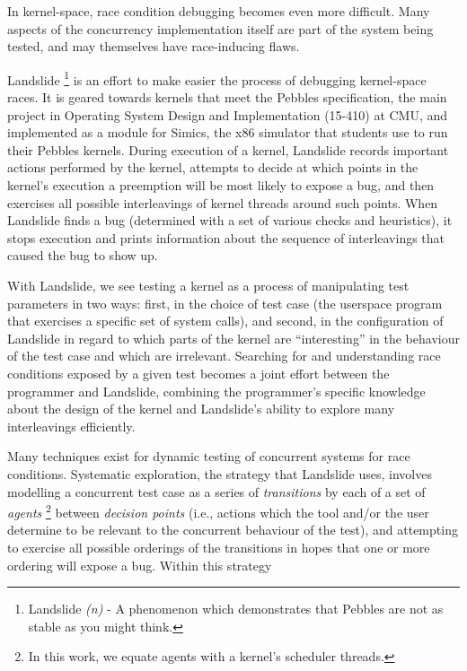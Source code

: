 \documentclass[10pt,twocolumn]{article}
\begin{document}
In kernel-space, race condition debugging becomes even more difficult. Many aspects of the concurrency implementation itself are part of the system being tested, and may themselves have race-inducing flaws.



Landslide
\footnote{Landslide {\em (n)} - A phenomenon which demonstrates that Pebbles are not as stable as you might think.}
is an effort to make easier the process of debugging kernel-space races.
It is geared towards kernels that meet the Pebbles specification, the main project in Operating System Design and Implementation (15-410) at CMU, and implemented as a module for Simics, the x86 simulator that students use to run their Pebbles kernels.
During execution of a kernel, Landslide records important actions performed by the kernel, attempts to decide at which points in the kernel's execution a preemption will be most likely to expose a bug, and then exercises all possible interleavings of kernel threads around such points.
When Landslide finds a bug (determined with a set of various checks and heuristics), it stops execution and prints information about the sequence of interleavings that caused the bug to show up.

With Landslide, we see testing a kernel as a process of manipulating test parameters in two ways: first, in the choice of test case (the userspace program that exercises a specific set of system calls), and second, in the configuration of Landslide in regard to which parts of the kernel are ``interesting'' in the behaviour of the test case and which are irrelevant.
Searching for and understanding race conditions exposed by a given test becomes a joint effort between the programmer and Landslide, combining the programmer's specific knowledge about the design of the kernel and Landslide's ability to explore many interleavings efficiently.

Many techniques exist for dynamic testing of concurrent systems for race conditions.
Systematic exploration, the strategy that Landslide uses, involves modelling a concurrent test case as a series of {\em transitions} by each of a set of {\em agents}
\footnote{In this work, we equate agents with a kernel's scheduler threads.}
between {\em decision points} (i.e., actions which the tool and/or the user determine to be relevant to the concurrent behaviour of the test), and attempting to exercise all possible orderings of the transitions in hopes that one or more ordering will expose a bug.
Within this strategy
\end{document}
